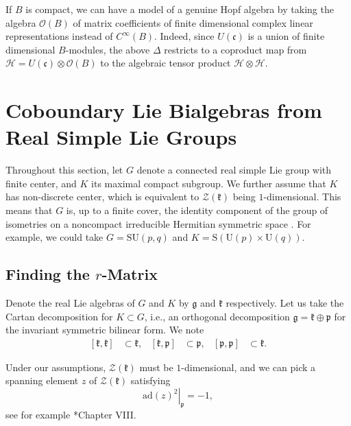 \documentclass[a4paper,11pt]{amsart}
\newcommand{\s}[1]{\mathcal{#1}}
\newcommand{\fr}[1]{\mathfrak{#1}}
\newcommand{\ad}{\mathrm{ad}}
\newcommand{\SU}{\mathrm{SU}}
\theoremstyle{definition}
\theoremstyle{remark}
\begin{document}
If $B$ is compact, we can have a model of a genuine Hopf algebra by taking the algebra $\s{O}(B)$ of matrix coefficients of finite dimensional complex linear representations instead of $C^\infty(B)$.
Indeed, since $U(\fr{c})$ is a union of finite dimensional $B$-modules, the above $\Delta$ restricts to a coproduct map from $\s H = U(\fr c) \otimes \s O(B)$ to the algebraic tensor product $\s H \otimes \s H$.

\section{Coboundary Lie Bialgebras from Real Simple Lie Groups}
\label{sec:cob-lie-bialg-from-real-simple}

Throughout this section, let $G$ denote a connected real simple Lie group with finite center, and $K$ its maximal compact subgroup.
We further assume that $K$ has non-discrete center, which is equivalent to $\s{Z}(\fr{k})$ being $1$-dimensional.
This means that $G$ is, up to a finite cover, the identity component of the group of isometries on a noncompact irreducible Hermitian symmetric space \cite{MR1834454}.
For example, we could take $G = \SU(p,q)$ and $K = \mathrm{S}(\mathrm{U}(p)\times\mathrm{U}(q))$.

\subsection{Finding the \texorpdfstring{$r$}{r}-Matrix}

Denote the real Lie algebras of $G$ and $K$ by $\fr{g}$ and $\fr{k}$ respectively.
Let us take the Cartan decomposition for $K \subset G$, i.e., an orthogonal decomposition $\fr{g} = \fr{k} \oplus \fr{p}$ for the invariant symmetric bilinear form.
We note
\begin{align}
\label{eq:cobr-rel-for-Cartan-decomp}
[\fr{k},\fr{k}] &\subset \fr{k},&
[\fr{k},\fr{p}] &\subset \fr{p},&
[\fr{p},\fr{p}] &\subset \fr{k} .
\end{align}

Under our assumptions, $\s{Z}(\fr{k})$ must be $1$-dimensional, and we can pick a spanning element $z$ of $\s{Z}(\fr{k})$ satisfying
\begin{equation}
\label{eq:z-normalization}
\left. \ad(z)^2 \right|_{\fr{p}} = - 1,
\end{equation}
see for example \cite{MR1834454}*{Chapter VIII}.
\end{document}
